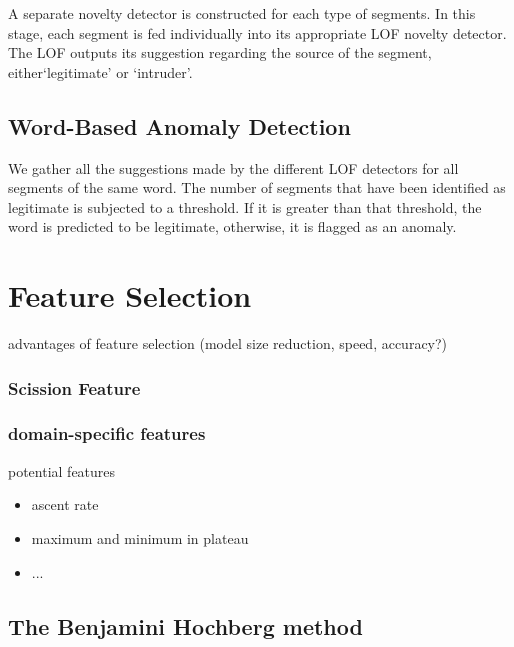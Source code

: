 \documentclass[conference]{IEEEtran}
\begin{document}
  A separate novelty detector is constructed for each type of segments.
  In this stage, each segment is fed individually into its appropriate LOF novelty detector. The LOF outputs its suggestion regarding the source of the segment, either`legitimate' or `intruder'.
  
\subsection{Word-Based Anomaly Detection}
  We gather all the suggestions made by the different LOF detectors for all segments of the same word. The number of segments that have been identified as legitimate is subjected to a threshold. If it is greater than that threshold, the word is predicted to be legitimate, otherwise, it is flagged as an anomaly.
  



\section{Feature Selection}

  \color{gray}
  advantages of feature selection (model size reduction, speed, accuracy?)
  \color{black}


\subsubsection{Scission Feature}

  \cite{kneib2018scission}

\subsubsection{domain-specific features}
  potential features
  \begin{itemize}
    \item ascent rate
    \item maximum and minimum in plateau
    \item ...
  \end{itemize}
 
 \subsection{The Benjamini Hochberg method}
 
\end{document}

